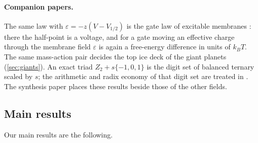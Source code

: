 \documentclass[11pt]{article}
\theoremstyle{definition}\newtheorem{definition}[theorem]{Definition}
\theoremstyle{remark}\newtheorem{remark}[theorem]{Remark}
\begin{document}
\paragraph{Companion papers.} The same law with $\varepsilon=-z(V-V_{1/2})$ is the gate law of excitable membranes \cite{Neuro}: there the half-point is a voltage, and for a gate moving an effective charge through the membrane field $\varepsilon$ is again a free-energy difference in units of $k_BT$. The same mass-action pair decides the top ice deck of the giant planets \cite{Planet} (\cref{sec:giants}). An exact triad $Z_2+s\{-1,0,1\}$ is the digit set of balanced ternary scaled by $s$; the arithmetic and radix economy of that digit set are treated in \cite{Algo}. The synthesis paper \cite{Synth} places these results beside those of the other fields.

\subsection{Main results}\label{sec:main}
Our main results are the following.
\end{document}

